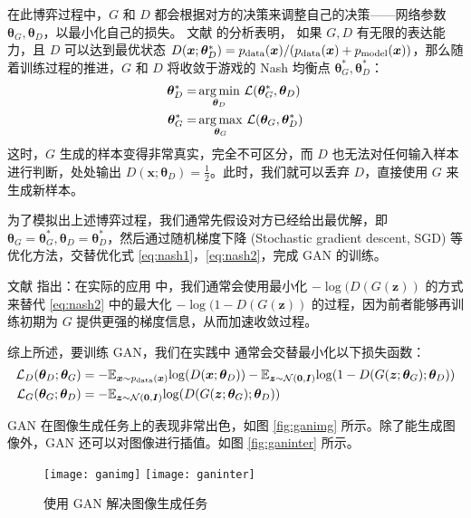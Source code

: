 在此博弈过程中，$G$ 和 $D$ 都会根据对方的决策来调整自己的决策——网络参数 $\bm \theta_G, \bm \theta_D$，以最小化自己的损失。
文献  的分析表明，%
如果 $G, D$ 有无限的表达能力，且 $D$ 可以达到最优状态 $D(\bm x; \bm\theta_D^*) = p_{\mathrm {data}}(\bm x)/(p_{\mathrm {data}}(\bm x) + p_{\mathrm {model}}(\bm x))$，那么随着训练过程的推进，$G$ 和 $D$ 将收敛于游戏的 Nash 均衡点 $\bm\theta_G^*, \bm\theta_D^*$：
\begin{subequations}
	\begin{align}
		\bm\theta_D^* = & \mathop{\arg\min}_{\bm\theta_D}\, \mathcal{L}(\bm\theta_G^*, \bm\theta_D)\label{eq:nash1} \\
		\bm\theta_G^* = & \mathop{\arg\max}_{\bm\theta_G}\, \mathcal{L}(\bm\theta_G, \bm\theta_D^*)\label{eq:nash2}
	\end{align}
\end{subequations}
这时，$G$ 生成的样本变得非常真实，完全不可区分，而 $D$ 也无法对任何输入样本进行判断，处处输出 $D(\bm x; \bm\theta_D) = \frac{1}{2}$。此时，我们就可以丢弃 $D$，直接使用 $G$ 来生成新样本。

为了模拟出上述博弈过程，我们通常先假设对方已经给出最优解，即 $\bm\theta_G = \bm\theta_G^*, \bm\theta_D = \bm\theta_D^*$，然后通过随机梯度下降 (Stochastic gradient descent, SGD) 等优化方法，交替优化式 \eqref{eq:nash1}，\eqref{eq:nash2}，完成 GAN 的训练。

文献  指出：在实际的应用%
中，我们通常会使用最小化
$- \log(D( G(\bm z))$
的方式来替代 \eqref{eq:nash2} 中的最大化
$- \log(1 - D( G(\bm z))$ 的过程，因为前者能够再训练初期为 $G$ 提供更强的梯度信息，从而加速收敛过程。

综上所述，要训练 GAN，我们在实践中%
通常会交替最小化以下损失函数：
\begin{subequations}
	\label{eq:ganloss0}
	\begin{align}
		\mathcal{L}_D(\bm\theta_D; \bm\theta_G) & =
		- \mathbb{E}_{\bm x \sim p_{\mathrm {data}}(\bm x)} {\log}(    D(\bm x; \bm\theta_D))
		- \mathbb{E}_{\bm z \sim \mathcal{N}(\bm 0, \bm I)} {\log}(1 - D( G(\bm z; \bm\theta_G); \bm\theta_D))
		\label{eq:ganloss1}                   \\
		\mathcal{L}_G(\bm\theta_G; \bm\theta_D) & =
		- \mathbb{E}_{\bm z \sim \mathcal{N}(\bm 0, \bm I)} {\log}(D( G(\bm z; \bm\theta_G); \bm\theta_D))
		\label{eq:ganloss2}
	\end{align}
\end{subequations}

GAN 在图像生成任务上的表现非常出色，如图 \ref{fig:ganimg} 所示。除了能生成图像外，GAN 还可以对图像进行插值。如图 \ref{fig:ganinter} 所示。
\begin{figure}[h]
	\centering%
	{\texttt{[image: ganimg]}}%
	\hspace{2em}%
	{\texttt{[image: ganinter]}}
	\caption{使用 GAN 解决图像生成任务\cite{dcgan}}
\end{figure}

